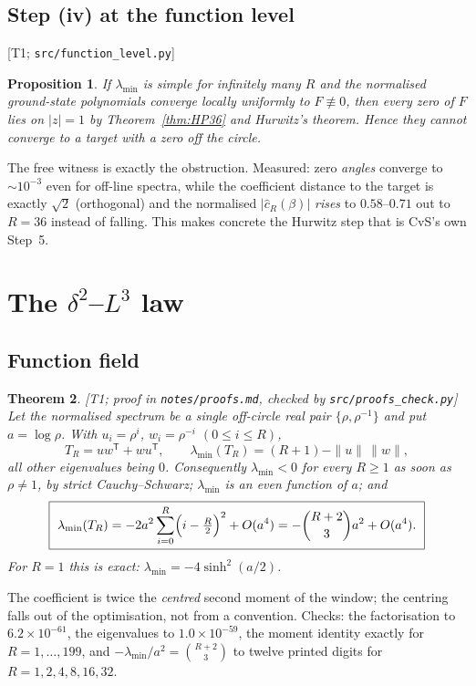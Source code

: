 \documentclass[11pt,a4paper]{article}
\newtheorem{theorem}{Theorem}
\newtheorem{proposition}[theorem]{Proposition}
\theoremstyle{definition}
\theoremstyle{remark}
\newcommand{\tier}[1]{{\small\textsf{[#1]}}}
\newcommand{\T}{T_R}
\newcommand{\lmin}{\lambda_{\min}}
\newcommand{\src}[1]{{\footnotesize\texttt{#1}}}
\begin{document}
\subsection{Step (iv) at the function level}
\tier{T1; \src{src/function\_level.py}}
\begin{proposition}\label{prop:hurwitz}
If $\lmin$ is simple for infinitely many $R$ and the normalised ground-state polynomials
converge locally uniformly to $F\not\equiv0$, then every zero of $F$ lies on $|z|=1$ by
Theorem~\ref{thm:HP36} and Hurwitz's theorem. Hence they cannot converge to a target with
a zero off the circle.
\end{proposition}
\noindent The free witness is exactly the obstruction. Measured: zero \emph{angles}
converge to $\sim10^{-3}$ even for off-line spectra, while the coefficient distance to the
target is exactly $\sqrt2$ (orthogonal) and the normalised $|\hat c_R(\beta)|$ \emph{rises}
to $0.58$--$0.71$ out to $R=36$ instead of falling. This makes concrete the Hurwitz step
that is CvS's own Step~5.

\section{The $\delta^2$--$L^3$ law}\label{sec:law}

\subsection{Function field}

\begin{theorem}\label{thm:ff}\tier{T1; proof in \src{notes/proofs.md}, checked by \src{src/proofs\_check.py}}
Let the normalised spectrum be a single off-circle real pair $\{\rho,\rho^{-1}\}$ and put
$a=\log\rho$. With $u_i=\rho^{i}$, $w_i=\rho^{-i}$ $(0\le i\le R)$,
\[
\T=uw^{\mathsf T}+wu^{\mathsf T},\qquad
\lmin(\T)=(R+1)-\|u\|\,\|w\|,
\]
all other eigenvalues being $0$. Consequently $\lmin<0$ for every $R\ge1$ as soon as
$\rho\ne1$, by strict Cauchy--Schwarz; $\lmin$ is an even function of $a$; and
\[
\boxed{\ \lmin(\T)=-2a^{2}\sum_{i=0}^{R}\Bigl(i-\tfrac R2\Bigr)^{2}+O(a^{4})
=-\binom{R+2}{3}a^{2}+O(a^{4}).\ }
\]
For $R=1$ this is exact: $\lmin=-4\sinh^{2}(a/2)$.
\end{theorem}

The coefficient is twice the \emph{centred} second moment of the window; the centring falls
out of the optimisation, not from a convention. Checks: the factorisation to $6.2\times10^{-61}$,
the eigenvalues to $1.0\times10^{-59}$, the moment identity exactly for $R=1,\dots,199$, and
$-\lmin/a^{2}=\binom{R+2}{3}$ to twelve printed digits for $R=1,2,4,8,16,32$.
\end{document}
